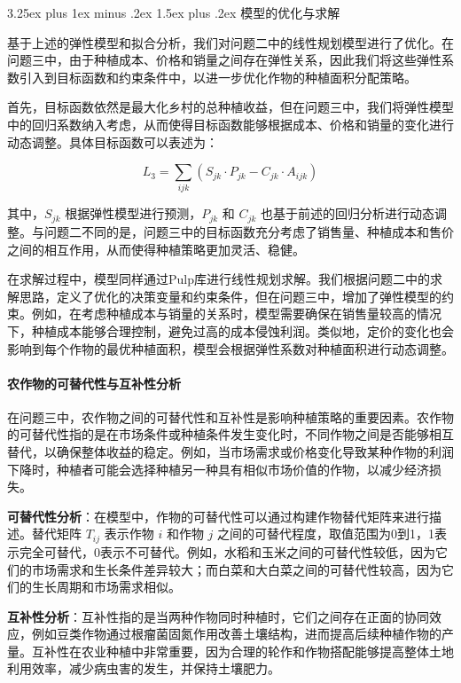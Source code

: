 \documentclass[12pt,a4paper]{nmmcm}
\makeatletter
\renewcommand\subsection{\@startsection{subsection}{2}{0pt}%
    {3.25ex plus 1ex minus .2ex}%
    {1.5ex plus .2ex}%
    {\normalfont\Large\bfseries}}
\makeatother
\begin{document}
\subsection{模型的优化与求解}

基于上述的弹性模型和拟合分析，我们对问题二中的线性规划模型进行了优化。在问题三中，由于种植成本、价格和销量之间存在弹性关系，因此我们将这些弹性系数引入到目标函数和约束条件中，以进一步优化作物的种植面积分配策略。

首先，目标函数依然是最大化乡村的总种植收益，但在问题三中，我们将弹性模型中的回归系数纳入考虑，从而使得目标函数能够根据成本、价格和销量的变化进行动态调整。具体目标函数可以表述为：

\[
L_3 = \sum_{ijk} \left( S_{jk} \cdot P_{jk} - C_{jk} \cdot A_{ijk} \right)
\]

其中，$S_{jk}$ 根据弹性模型进行预测，$P_{jk}$ 和 $C_{jk}$ 也基于前述的回归分析进行动态调整。与问题二不同的是，问题三中的目标函数充分考虑了销售量、种植成本和售价之间的相互作用，从而使得种植策略更加灵活、稳健。

在求解过程中，模型同样通过Pulp库进行线性规划求解。我们根据问题二中的求解思路，定义了优化的决策变量和约束条件，但在问题三中，增加了弹性模型的约束。例如，在考虑种植成本与销量的关系时，模型需要确保在销售量较高的情况下，种植成本能够合理控制，避免过高的成本侵蚀利润。类似地，定价的变化也会影响到每个作物的最优种植面积，模型会根据弹性系数对种植面积进行动态调整。


\paragraph{农作物的可替代性与互补性分析}

在问题三中，农作物之间的可替代性和互补性是影响种植策略的重要因素。农作物的可替代性指的是在市场条件或种植条件发生变化时，不同作物之间是否能够相互替代，以确保整体收益的稳定。例如，当市场需求或价格变化导致某种作物的利润下降时，种植者可能会选择种植另一种具有相似市场价值的作物，以减少经济损失。

\textbf{可替代性分析}：在模型中，作物的可替代性可以通过构建作物替代矩阵来进行描述。替代矩阵 $T_{ij}$ 表示作物 $i$ 和作物 $j$ 之间的可替代程度，取值范围为0到1，1表示完全可替代，0表示不可替代。例如，水稻和玉米之间的可替代性较低，因为它们的市场需求和生长条件差异较大；而白菜和大白菜之间的可替代性较高，因为它们的生长周期和市场需求相似。

\textbf{互补性分析}：互补性指的是当两种作物同时种植时，它们之间存在正面的协同效应，例如豆类作物通过根瘤菌固氮作用改善土壤结构，进而提高后续种植作物的产量。互补性在农业种植中非常重要，因为合理的轮作和作物搭配能够提高整体土地利用效率，减少病虫害的发生，并保持土壤肥力。
\end{document}
